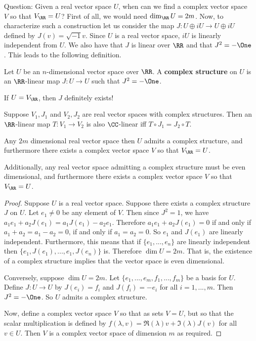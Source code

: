 Question: Given a real vector space $U$, when can we find a complex vector space $V$ so that $V_{\RR}=U$? First of all, we would need $\dim_{\RR} U = 2m$. Now, to characterize such a construction let us consider the map $J: U\oplus iU \to U\oplus iU$ defined by $J(v) = \sqrt{-1}v$. Since $U$ is a real vector space, $iU$ is linearly independent from $U$. We also have that $J$ is linear over $\RR$ and that $J^2 = -\One$. This leads to the following definition.
\begin{defn}
    Let $U$ be an $n$-dimensional vector space over $\RR$. A \textbf{complex structure} on $U$ is an $\RR$-linear map $J : U \to U$ such that $J^2 = -\One$.
\end{defn}
If $U = V_{\RR}$, then $J$ definitely exists! 
\begin{remark*}
    Suppose $V_1, J_1$ and $V_2,J_2$ are real vector spaces with complex structures. Then an $\RR$-linear map $T : V_1 \to V_2$ is also $\CC$-linear iff $T\circ J_1 = J_2\circ T$.
\end{remark*}
\begin{thm}Any $2m$ dimensional real vector space then $U$ admits a complex structure, and furthermore there exists a complex vector space $V$ so that $V_{\RR}=U$.

Additionally, any real vector space admitting a complex structure must be even dimensional, and furthermore there exists a complex vector space $V$ so that $V_{\RR}=U$.
\end{thm}
\begin{proof}
Suppose $U$ is a real vector space. Suppose there exists a complex structure $J$ on $U$. Let $e_1\neq 0$ be any element of $V$. Then since $J^2 = 1$, we have $a_1 e_1 + a_2 J(e_1) = a_1 J(e_1) - a_2 e_1$. Therefore $a_1e_1+a_2J(e_1)=0$ if and only if $a_1+a_2=a_1-a_2=0$, if and only if $a_1=a_2=0$. So $e_1$ and $J(e_1)$ are linearly independent. Furthermore, this means that if $\{e_1,...,e_n\}$ are linearly independent then $\{e_1,J(e_1),...,e_1,J(e_n)\}$ is. Therefore $\dim U = 2m$. That is, the existence of a complex structure implies that the vector space is even dimensional.

Conversely, suppose $\dim U = 2m$. Let $\{e_1,...,e_m,f_1,...,f_m\}$ be a basis for $U$. Define $J : U \to U$ by $J(e_i) = f_i$ and $J(f_i)=-e_i$ for all $i=1,...,m$. Then $J^2 = -\One$. So $U$ admits a complex structure.

Now, define a complex vector space $V$ so that as sets $V=U$, but so that the scalar multiplication is defined by $f(\lambda,v)= \Re(\lambda)v + \Im(\lambda)J(v)$ for all $v\in U$. Then $V$ is a complex vector space of dimension $m$ as required.
\end{proof}

